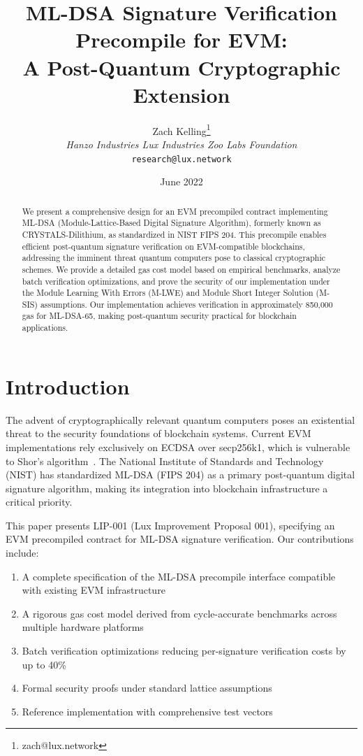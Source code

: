 \documentclass[11pt,a4paper]{article}
\title{ML-DSA Signature Verification Precompile for EVM:\\A Post-Quantum Cryptographic Extension}
\author{Zach Kelling\thanks{zach@lux.network} \\ \textit{Hanzo Industries \quad Lux Industries \quad Zoo Labs Foundation} \\ \texttt{research@lux.network}}
\date{June 2022}
\begin{document}
\maketitle

\begin{abstract}
We present a comprehensive design for an EVM precompiled contract implementing ML-DSA (Module-Lattice-Based Digital Signature Algorithm), formerly known as CRYSTALS-Dilithium, as standardized in NIST FIPS 204. This precompile enables efficient post-quantum signature verification on EVM-compatible blockchains, addressing the imminent threat quantum computers pose to classical cryptographic schemes. We provide a detailed gas cost model based on empirical benchmarks, analyze batch verification optimizations, and prove the security of our implementation under the Module Learning With Errors (M-LWE) and Module Short Integer Solution (M-SIS) assumptions. Our implementation achieves verification in approximately 850,000 gas for ML-DSA-65, making post-quantum security practical for blockchain applications.
\end{abstract}

\section{Introduction}

The advent of cryptographically relevant quantum computers poses an existential threat to the security foundations of blockchain systems. Current EVM implementations rely exclusively on ECDSA over secp256k1, which is vulnerable to Shor's algorithm~\cite{shor1994}. The National Institute of Standards and Technology (NIST) has standardized ML-DSA (FIPS 204) as a primary post-quantum digital signature algorithm, making its integration into blockchain infrastructure a critical priority.

This paper presents LIP-001 (Lux Improvement Proposal 001), specifying an EVM precompiled contract for ML-DSA signature verification. Our contributions include:

\begin{enumerate}
    \item A complete specification of the ML-DSA precompile interface compatible with existing EVM infrastructure
    \item A rigorous gas cost model derived from cycle-accurate benchmarks across multiple hardware platforms
    \item Batch verification optimizations reducing per-signature verification costs by up to 40\%
    \item Formal security proofs under standard lattice assumptions
    \item Reference implementation with comprehensive test vectors
\end{enumerate}
\end{document}
